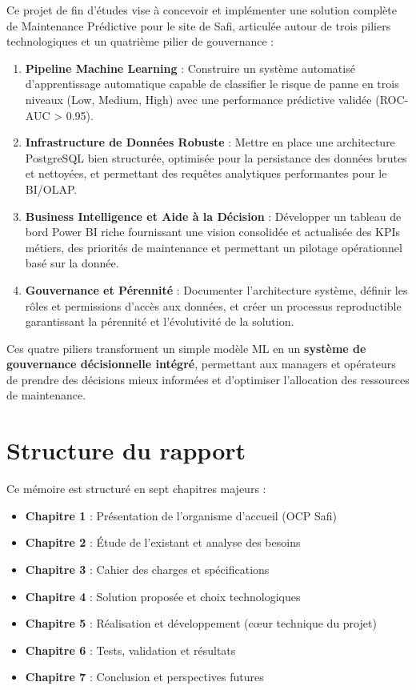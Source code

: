 \documentclass[a4paper,12pt,twoside]{report}
\begin{document}
Ce projet de fin d'études vise à concevoir et implémenter une solution complète de Maintenance Prédictive pour le site de Safi, articulée autour de trois piliers technologiques et un quatrième pilier de gouvernance :

\begin{enumerate}
    \item \textbf{Pipeline Machine Learning} : Construire un système automatisé d'apprentissage automatique capable de classifier le risque de panne en trois niveaux (Low, Medium, High) avec une performance prédictive validée (ROC-AUC > 0.95).
    
    \item \textbf{Infrastructure de Données Robuste} : Mettre en place une architecture PostgreSQL bien structurée, optimisée pour la persistance des données brutes et nettoyées, et permettant des requêtes analytiques performantes pour le BI/OLAP.
    
    \item \textbf{Business Intelligence et Aide à la Décision} : Développer un tableau de bord Power BI riche fournissant une vision consolidée et actualisée des KPIs métiers, des priorités de maintenance et permettant un pilotage opérationnel basé sur la donnée.
    
    \item \textbf{Gouvernance et Pérennité} : Documenter l'architecture système, définir les rôles et permissions d'accès aux données, et créer un processus reproductible garantissant la pérennité et l'évolutivité de la solution.
\end{enumerate}

Ces quatre piliers transforment un simple modèle ML en un \textbf{système de gouvernance décisionnelle intégré}, permettant aux managers et opérateurs de prendre des décisions mieux informées et d'optimiser l'allocation des ressources de maintenance.

\section*{Structure du rapport}

Ce mémoire est structuré en sept chapitres majeurs :

\begin{itemize}
    \item \textbf{Chapitre 1} : Présentation de l'organisme d'accueil (OCP Safi)
    \item \textbf{Chapitre 2} : Étude de l'existant et analyse des besoins
    \item \textbf{Chapitre 3} : Cahier des charges et spécifications
    \item \textbf{Chapitre 4} : Solution proposée et choix technologiques
    \item \textbf{Chapitre 5} : Réalisation et développement (cœur technique du projet)
    \item \textbf{Chapitre 6} : Tests, validation et résultats
    \item \textbf{Chapitre 7} : Conclusion et perspectives futures
\end{itemize}
\end{document}
